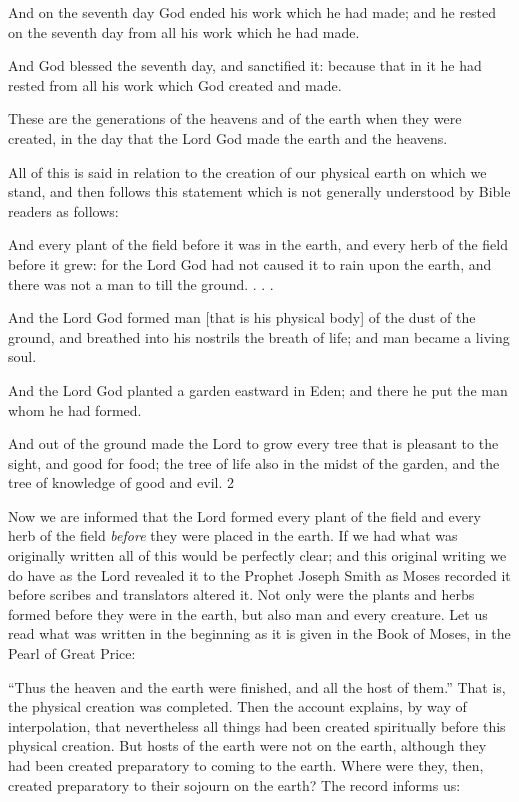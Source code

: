 And on the seventh day God ended his work which he had made; and he rested on the
seventh day from all his work which he had made.

And God blessed the seventh day, and sanctified it: because that in it he had rested from all
his work which God created and made.

These are the generations of the heavens and of the earth when they were created, in the day
that the Lord God made the earth and the heavens.

All of this is said in relation to the creation of our physical earth on which we stand, and then
follows this statement which is not generally understood by Bible readers as follows:

And every plant of the field before it was in the earth, and every herb of the field before it
grew: for the Lord God had not caused it to rain upon the earth, and there was not a man to
till the ground. . . .

And the Lord God formed man [that is his physical body] of the dust of the ground, and
breathed into his nostrils the breath of life; and man became a living soul.

And the Lord God planted a garden eastward in Eden; and there he put the man whom he had
formed.

And out of the ground made the Lord to grow every tree that is pleasant to the sight, and
good for food; the tree of life also in the midst of the garden, and the tree of knowledge of
good and evil. 2

Now we are informed that the Lord formed every plant of the field and every herb of the field
\textit{before} they were placed in the earth. If we had what was originally written all of this would
be perfectly clear; and this original writing we do have as the Lord revealed it to the Prophet
Joseph Smith as Moses recorded it before scribes and translators altered it. Not only were the
plants and herbs formed before they were in the earth, but also man and every creature. Let
us read what was written in the beginning as it is given in the Book of Moses, in the Pearl of
Great Price:

``Thus the heaven and the earth were finished, and all the host of them.'' That is, the physical
creation was completed. Then the account explains, by way of interpolation, that nevertheless
all things had been created spiritually before this physical creation. But hosts of the earth
were not on the earth, although they had been created preparatory to coming to the earth.
Where were they, then, created preparatory to their sojourn on the earth? The record informs
us:

